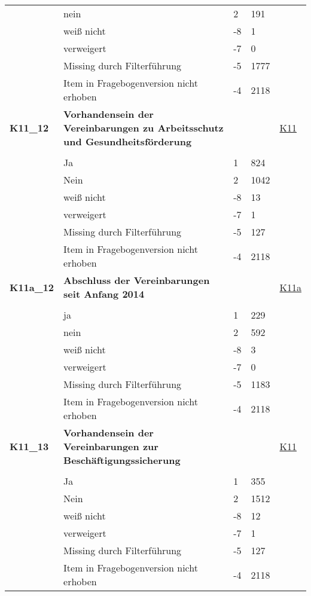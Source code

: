 \begin{longtable}{| L{2.5cm} | L{8.25cm}| C{1.5cm} | R{1.25cm} | C{2.25cm} |  }
   & nein & 2 & 191 &  \\ 
   & weiß nicht & -8 & 1 &  \\ 
   & verweigert & -7 & 0 &  \\ 
   & Missing durch Filterführung & -5 & 1777 &  \\ 
   & Item in Fragebogenversion nicht erhoben & -4 & 2118 &  \\ 
   \midrule
\textbf{K11\_12}\label{var:suf:K11:12} & \textbf{Vorhandensein der Vereinbarungen zu Arbeitsschutz und Gesundheitsförderung} &  &  & \hyperref[K11]{K11} \\ 
   &  &  &  &  \\ 
   & Ja & 1 & 824 &  \\ 
   & Nein & 2 & 1042 &  \\ 
   & weiß nicht & -8 & 13 &  \\ 
   & verweigert & -7 & 1 &  \\ 
   & Missing durch Filterführung & -5 & 127 &  \\ 
   & Item in Fragebogenversion nicht erhoben & -4 & 2118 &  \\ 
   \midrule
\textbf{K11a\_12}\label{var:suf:K11a:12} & \textbf{Abschluss der Vereinbarungen seit Anfang 2014} &  &  & \hyperref[K11a]{K11a} \\ 
   &  &  &  &  \\ 
   & ja & 1 & 229 &  \\ 
   & nein & 2 & 592 &  \\ 
   & weiß nicht & -8 & 3 &  \\ 
   & verweigert & -7 & 0 &  \\ 
   & Missing durch Filterführung & -5 & 1183 &  \\ 
   & Item in Fragebogenversion nicht erhoben & -4 & 2118 &  \\ 
   \midrule
\textbf{K11\_13}\label{var:suf:K11:13} & \textbf{Vorhandensein der Vereinbarungen zur Beschäftigungssicherung} &  &  & \hyperref[K11]{K11} \\ 
   &  &  &  &  \\ 
   & Ja & 1 & 355 &  \\ 
   & Nein & 2 & 1512 &  \\ 
   & weiß nicht & -8 & 12 &  \\ 
   & verweigert & -7 & 1 &  \\ 
   & Missing durch Filterführung & -5 & 127 &  \\ 
   & Item in Fragebogenversion nicht erhoben & -4 & 2118 &  \\ 

\end{longtable}
